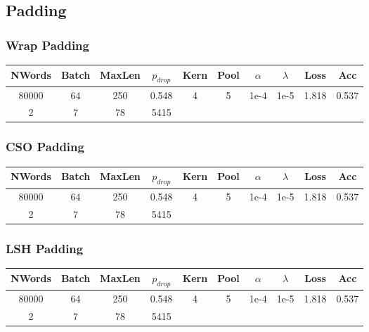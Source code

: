 \subsection{Padding}
\subsubsection{Wrap Padding}
\begin{center}\begin{tabular}{||c c c c c c c c c c ||}
 \hline
 NWords & Batch & MaxLen & $p_{drop}$ & Kern & Pool & $\alpha$ & $\lambda$ &  Loss & Acc\\ [0.5ex]
 \hline\hline
 80000 & 64 & 250 & 0.548 & 4 & 5 & 1e-4 & 1e-5 & 1.818 & 0.537\\
 \hline
 2 & 7 & 78 & 5415 \\
 [1ex]\hline\end{tabular}\end{center}

\subsubsection{CSO Padding}
\begin{center}\begin{tabular}{||c c c c c c c c c c ||}
 \hline
 NWords & Batch & MaxLen & $p_{drop}$ & Kern & Pool & $\alpha$ & $\lambda$ &  Loss & Acc\\ [0.5ex]
 \hline\hline
 80000 & 64 & 250 & 0.548 & 4 & 5 & 1e-4 & 1e-5 & 1.818 & 0.537\\
 \hline
 2 & 7 & 78 & 5415 \\
 [1ex]\hline\end{tabular}\end{center}
\subsubsection{LSH Padding}
\begin{center}\begin{tabular}{||c c c c c c c c c c ||}
 \hline
 NWords & Batch & MaxLen & $p_{drop}$ & Kern & Pool & $\alpha$ & $\lambda$ &  Loss & Acc\\ [0.5ex]
 \hline\hline
 80000 & 64 & 250 & 0.548 & 4 & 5 & 1e-4 & 1e-5 & 1.818 & 0.537\\
 \hline
 2 & 7 & 78 & 5415 \\
 [1ex]\hline\end{tabular}\end{center}


